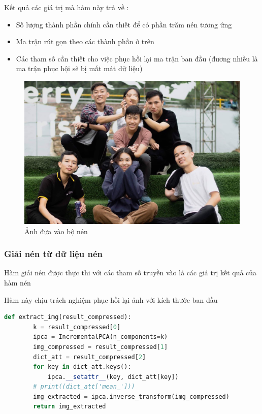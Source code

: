 Kết quả các giá trị mà hàm này trả về :
\begin{itemize}
    \item Số lượng thành phần chính cần thiết để có phần trăm nén tương ứng
    \item Ma trận rút gọn theo các thành phần ở trên
    \item Các tham số cần thiết cho việc phục hồi lại ma trận ban đầu (đương nhiều là ma trận phục hội sẽ bị mất mát dữ liệu)
\end{itemize}

\begin{center}
    \begin{figure}[htp]
        \begin{center}
            \includegraphics[width=\textwidth,height=\textheight,keepaspectratio]{Chapters/07_DimemsionalityReduction/27_pca/imgg_origin.jpg}
        \end{center}
        \caption{Ảnh đưa vào bộ nén}
        \label{fig:27_7}
    \end{figure}
\end{center}

\subsubsection{Giải nén từ dữ liệu nén}

Hàm giải nén được thực thi với các tham số truyền vào là các giá trị kết quả của hàm nén

Hàm này chịu trách nghiệm phục hồi lại ảnh với kích thước ban đầu

\begin{lstlisting}[language=Python]
    def extract_img(result_compressed):
        k = result_compressed[0]
        ipca = IncrementalPCA(n_components=k)
        img_compressed = result_compressed[1]
        dict_att = result_compressed[2]
        for key in dict_att.keys():
            ipca.__setattr__(key, dict_att[key])
        # print((dict_att['mean_']))
        img_extracted = ipca.inverse_transform(img_compressed)
        return img_extracted
    
\end{lstlisting}

